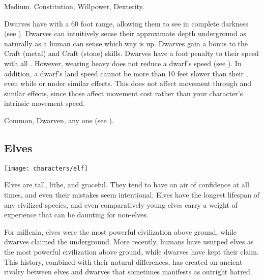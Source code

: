          Medium.
          Constitution,  Willpower,  Dexterity.
        \begin{raggeditemize}
             Dwarves have  with a 60 foot range, allowing them to see in complete darkness (see ).
             Dwarves can intuitively sense their approximate depth underground as naturally as a human can sense which way is up.
             Dwarves gain a  bonus to the Craft (metal) and Craft (stone) skills.
             Dwarves have a  foot penalty to their speed with all .
                However, wearing heavy  does not reduce a dwarf's speed (see ).
                In addition, a dwarf's land speed cannot be more than 10 feet slower than their , even while \slowed or under similar effects.
                This does not affect movement through  and similar effects, since those affect movement cost rather than your character's intrinsic movement speed.
        \end{raggeditemize}
         Common, Dwarven, any one  (see ).

    \subsection{Elves}
        \texttt{[image: characters/elf]}

        Elves are tall, lithe, and graceful.
        They tend to have an air of confidence at all times, and even their mistakes seem intentional.
        Elves have the longest lifespan of any civilized species, and even comparatively young elves carry a weight of experience that can be daunting for non-elves.

        For millenia, elves were the most powerful civilization above ground, while dwarves claimed the underground.
        More recently, humans have usurped elves as the most powerful civilization above ground, while dwarves have kept their claim.
        This history, combined with their natural differences, has created an ancient rivalry between elves and dwarves that sometimes manifests as outright hatred.

